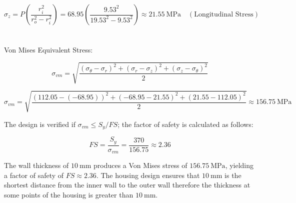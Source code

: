\documentclass[12pt, letterpaper]{report}%
\begin{document}
            \begin{equation}
            \sigma_{z} = P \left( \frac{r_i^2}{r_o^2 - r_i^2} \right) = 68.95 \left( \frac{9.53^2}{19.53^2 - 9.53^2} \right) \approx 21.55 \ \text{MPa} \quad (\text{Longitudinal Stress})
            \label{longitudinal}
            \end{equation}
            \\~\\
            Von Mises Equivalent Stress:
            
            \begin{equation}
            \sigma_{vm} = \sqrt{\frac{(\sigma_\theta - \sigma_r)^2 + (\sigma_r - \sigma_z)^2 + (\sigma_z - \sigma_\theta)^2}{2}}
            \label{vonmises}  
            \end{equation}

            \begin{equation}
            \sigma_{vm} = \sqrt{\frac{(112.05 - (-68.95))^2 + (-68.95 - 21.55)^2 + (21.55 - 112.05)^2}{2}} 
            \approx 156.75 \ \text{MPa}
            \label{vonmises2}     
            \end{equation}

            The design is verified if $\sigma_{vm} \leq S_y / FS$; the factor of safety is calculated as follows:
            
            \begin{equation}
            FS = \frac{S_y}{\sigma_{vm}} = \frac{370}{156.75} \approx 2.36
            \label{fs}
            \end{equation}

            The wall thickness of $10\ \text{mm}$ produces a Von Mises stress of $156.75\ \text{MPa}$, yielding a factor of safety of $FS \approx 2.36$.
            The housing design ensures that $10\ \text{mm}$ is the shortest distance from the inner wall to the outer wall therefore the thickness at some points of the housing is greater than $10\ \text{mm}$.
            
\end{document}
